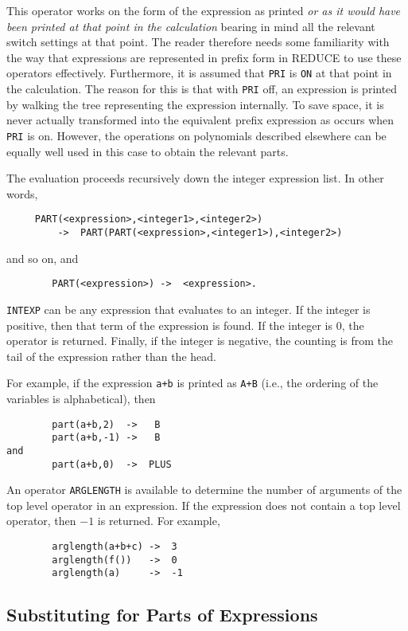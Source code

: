\documentclass[11pt,letterpaper]{book}
\makeatletter
\newcommand{\REDUCE}{REDUCE}
\newcommand{\underscore}{\_}
\newcommand{\ttindex}[1]{{\renewcommand{\_}{\protect\underscore}%
                          \index{#1@{\tt #1}}}}
\makeatother
\begin{document}
This operator works on the form of the expression as printed {\em or as it
would have been printed at that point in the calculation\/} bearing in mind
all the relevant switch settings at that point.  The reader therefore
needs some familiarity with the way that expressions are represented in
prefix form in {\REDUCE} to use these operators effectively.  Furthermore,
it is assumed that {\tt PRI} is {\tt ON} at that point in the calculation.
The reason for this is that with {\tt PRI} off, an expression is printed
by walking the tree representing the expression internally.  To save
space, it is never actually transformed into the equivalent prefix
expression as occurs when {\tt PRI} is on.  However, the operations on
polynomials described elsewhere can be equally well used in this case to
obtain the relevant parts.

The evaluation proceeds recursively down the integer expression list. In
other words,
{\small\begin{verbatim}
     PART(<expression>,<integer1>,<integer2>)
         ->  PART(PART(<expression>,<integer1>),<integer2>)
\end{verbatim}}
 and so on, and
{\small\begin{verbatim}
        PART(<expression>) ->  <expression>.
\end{verbatim}}
{\tt INTEXP} can be any expression that evaluates to an integer.  If the
integer is positive, then that term of the expression is found.  If the
integer is 0, the operator is returned.  Finally, if the integer is
negative, the counting is from the tail of the expression rather than the
head.

For example, if the expression {\tt a+b} is printed as {\tt A+B} (i.e.,
the ordering of the variables is alphabetical), then
{\small\begin{verbatim}
        part(a+b,2)  ->   B
        part(a+b,-1) ->   B
and
        part(a+b,0)  ->  PLUS
\end{verbatim}}
An operator {\tt ARGLENGTH}\ttindex{ARGLENGTH} is available to determine
the number of arguments of the top level operator in an expression.  If
the expression does not contain a top level operator, then $-1$ is returned.
For example,
{\small\begin{verbatim}
        arglength(a+b+c) ->  3
        arglength(f())   ->  0
        arglength(a)     ->  -1
\end{verbatim}}

\subsection{Substituting for Parts of Expressions}
\end{document}
